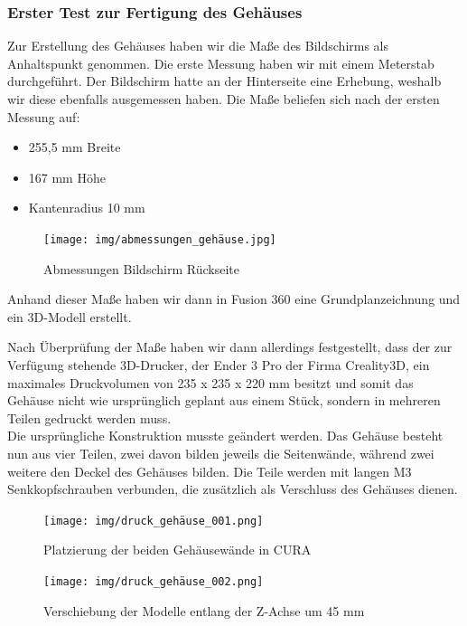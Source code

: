 \subsubsection{Erster Test zur Fertigung des Gehäuses}\label{hw_case_ersterTest}
Zur Erstellung des Gehäuses haben wir die Maße des Bildschirms als Anhaltspunkt genommen. 
Die erste Messung haben wir mit einem Meterstab durchgeführt.
Der Bildschirm hatte an der Hinterseite eine Erhebung, weshalb wir diese ebenfalls ausgemessen haben. 
Die Maße beliefen sich nach der ersten Messung auf:
\begin{itemize}
	\item 255,5 mm Breite
	\item 167 mm Höhe
	\item Kantenradius 10 mm
\end{itemize}
\begin{figure}[H]
	\texttt{[image: img/abmessungen\_gehäuse.jpg]}
	\caption[Abmessungen Bildschirm Rückseite]{Abmessungen Bildschirm Rückseite}
	\label{fig:screen-back-01}
\end{figure}
\noindent Anhand dieser Maße haben wir dann in Fusion 360 eine Grundplanzeichnung und ein 3D-Modell erstellt.\par	
\noindent Nach Überprüfung der Maße haben wir dann allerdings festgestellt, dass der zur Verfügung stehende 3D-Drucker, der Ender 3 Pro der Firma Creality3D, ein maximales Druckvolumen von 235 x 235 x 220 mm besitzt und somit das Gehäuse nicht wie ursprünglich geplant aus einem Stück, sondern in mehreren Teilen gedruckt werden muss. \\
\noindent Die ursprüngliche Konstruktion musste geändert werden. 
Das Gehäuse besteht nun aus vier Teilen, zwei davon bilden jeweils die Seitenwände, während zwei weitere den Deckel des Gehäuses bilden. 
Die Teile werden mit langen M3 Senkkopfschrauben verbunden, die zusätzlich als Verschluss des Gehäuses dienen.\par
\begin{figure}[H]
	\texttt{[image: img/druck\_gehäuse\_001.png]}
	\caption[Platzierung der beiden Gehäusewände in CURA]{Platzierung der beiden Gehäusewände in CURA}
	\label{fig:print-case-test_01}
\end{figure}
\begin{figure}[H]
	\texttt{[image: img/druck\_gehäuse\_002.png]}
	\caption[Verschiebung der Modelle entlang der Z-Achse um 45mm]{Verschiebung der Modelle entlang der Z-Achse um 45 mm}
	\label{fig:print-case-test_02}
\end{figure}
